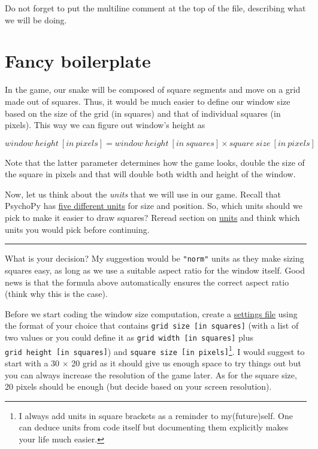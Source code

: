 \documentclass[
]{book}
\begin{document}
Do not forget to put the multiline comment at the top of the file, describing what we will be doing.

\hypertarget{fancy-boilerplate}{%
\section{Fancy boilerplate}\label{fancy-boilerplate}}

In the game, our snake will be composed of square segments and move on a grid made out of squares. Thus, it would be much easier to define our window size based on the size of the grid (in squares) and that of individual squares (in pixels). This way we can figure out window's height as

\[window~height~[in~pixels] = window~height~[in~squares] \times square~size~[in~pixels]\]

Note that the latter parameter determines how the game looks, double the size of the square in pixels and that will double both width and height of the window.

Now, let us think about the \emph{units} that we will use in our game. Recall that PsychoPy has \protect\hyperlink{psychopy-units}{five different units} for size and position. So, which units should we pick to make it easier to draw squares? Reread section on \protect\hyperlink{psychopy-units}{units} and think which units you would pick before continuing.

\begin{center}\rule{0.5\linewidth}{0.5pt}\end{center}

What is your decision? My suggestion would be \texttt{"norm"} units as they make sizing squares easy, as long as we use a suitable aspect ratio for the window itself. Good news is that the formula above automatically ensures the correct aspect ratio (think why this is the case).

Before we start coding the window size computation, create a \protect\hyperlink{settings-files}{settings file} using the format of your choice that contains \texttt{grid\ size\ {[}in\ squares{]}} (with a list of two values or you could define it as \texttt{grid\ width\ {[}in\ squares{]}} plus \texttt{grid\ height\ {[}in\ squares{]}}) and \texttt{square\ size\ {[}in\ pixels{]}}\footnote{I always add units in square brackets as a reminder to my(future)self. One can deduce units from code itself but documenting them explicitly makes your life much easier.}. I would suggest to start with a 30 × 20 grid as it should give us enough space to try things out but you can always increase the resolution of the game later. As for the square size, 20 pixels should be enough (but decide based on your screen resolution).
\end{document}
